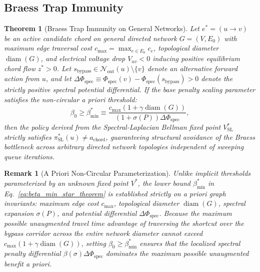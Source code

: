 \documentclass[11pt,a4paper]{article}
\newtheorem{theorem}{Theorem}
\newtheorem{remark}{Remark}
\begin{document}
\subsection{Braess Trap Immunity}
\begin{theorem}[Braess Trap Immunity on General Networks]
\label{thm:immunity}
\label{thm:trap_immunity}
Let $e^* = (u \to v)$ be an active candidate chord on general directed network $G = (V, E_0)$ with maximum edge traversal cost $c_{\max} = \max_{e \in E_0} c_e$, topological diameter $\operatorname{diam}(G)$, and electrical voltage drop $V_{uv} < 0$ inducing positive equilibrium chord flow $z^* > 0$. Let $s_{\text{bypass}} \in \mathcal{N}_{\text{out}}(u) \setminus \{v\}$ denote an alternative forward action from $u$, and let $\Delta \Phi_{\text{spec}} \equiv \Phi_{\text{spec}}(v) - \Phi_{\text{spec}}(s_{\text{bypass}}) > 0$ denote the strictly positive spectral potential differential. If the base penalty scaling parameter satisfies the non-circular a priori threshold:
\begin{equation}
\label{eq:beta_min_star_theorem}
\beta_0 \ge \beta_{\min}^* \equiv \frac{c_{\max} \left( 1 + \gamma \operatorname{diam}(G) \right)}{(1 + \sigma(P)) \Delta \Phi_{\text{spec}}},
\end{equation}
then the policy derived from the Spectral-Laplacian Bellman fixed point $V_{\text{SL}}^*$ strictly satisfies $\pi_{\text{SL}}^*(u) \ne a_{\text{chord}}$, guaranteeing structural avoidance of the Braess bottleneck across arbitrary directed network topologies independent of sweeping queue iterations.
\end{theorem}

\begin{remark}[A Priori Non-Circular Parameterization]
Unlike implicit thresholds parameterized by an unknown fixed point $V^*$, the lower bound $\beta_{\min}^*$ in Eq.~\eqref{eq:beta_min_star_theorem} is established strictly on a priori graph invariants: maximum edge cost $c_{\max}$, topological diameter $\operatorname{diam}(G)$, spectral expansion $\sigma(P)$, and potential differential $\Delta \Phi_{\text{spec}}$. Because the maximum possible unaugmented travel time advantage of traversing the shortcut over the bypass corridor across the entire network diameter cannot exceed $c_{\max}(1 + \gamma \operatorname{diam}(G))$, setting $\beta_0 \ge \beta_{\min}^*$ ensures that the localized spectral penalty differential $\beta(\sigma) \Delta \Phi_{\text{spec}}$ dominates the maximum possible unaugmented benefit a priori.
\end{remark}
\end{document}
